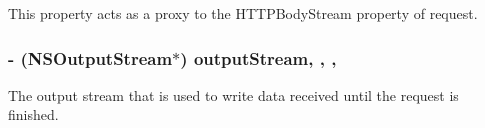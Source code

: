 This property acts as a proxy to the {\ttfamily H\-T\-T\-P\-Body\-Stream} property of {\ttfamily request}. \hypertarget{interface_a_f_u_r_l_connection_operation_a369c54f83f2edaae3a726e6cde799fb8}{
\subsubsection[{output\-Stream}]{\setlength{\rightskip}{0pt plus 5cm}-\/ (N\-S\-Output\-Stream$\ast$) output\-Stream\hspace{0.3cm}{\ttfamily [read]}, {\ttfamily [write]}, {\ttfamily [nonatomic]}, {\ttfamily [strong]}}}\label{interface_a_f_u_r_l_connection_operation_a369c54f83f2edaae3a726e6cde799fb8}
The output stream that is used to write data received until the request is finished.

